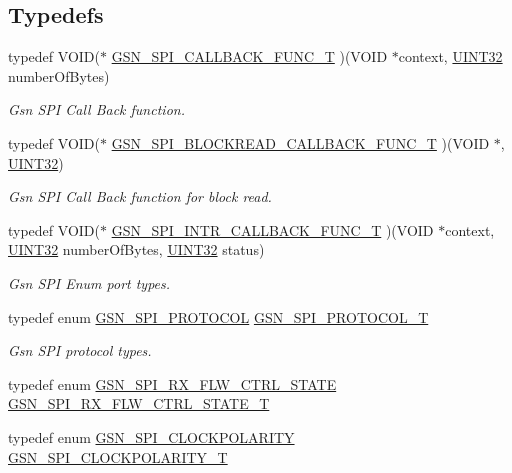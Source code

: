 \subsection*{Typedefs}
\begin{DoxyCompactItemize}
\item 
typedef VOID($\ast$ \hyperlink{a00655_gad27c6db61273e0b521637db94b638cdb}{GSN\_\-SPI\_\-CALLBACK\_\-FUNC\_\-T} )(VOID $\ast$context, \hyperlink{a00660_gae1e6edbbc26d6fbc71a90190d0266018}{UINT32} numberOfBytes)
\begin{DoxyCompactList}\small\item\em Gsn SPI Call Back function. \end{DoxyCompactList}\item 
typedef VOID($\ast$ \hyperlink{a00655_ga40c92f454b32d5fffa9780896cecdd02}{GSN\_\-SPI\_\-BLOCKREAD\_\-CALLBACK\_\-FUNC\_\-T} )(VOID $\ast$, \hyperlink{a00660_gae1e6edbbc26d6fbc71a90190d0266018}{UINT32})
\begin{DoxyCompactList}\small\item\em Gsn SPI Call Back function for block read. \end{DoxyCompactList}\item 
typedef VOID($\ast$ \hyperlink{a00655_ga4319e7be0e14776c7cd2c7ff7ca8f2c2}{GSN\_\-SPI\_\-INTR\_\-CALLBACK\_\-FUNC\_\-T} )(VOID $\ast$context, \hyperlink{a00660_gae1e6edbbc26d6fbc71a90190d0266018}{UINT32} numberOfBytes, \hyperlink{a00660_gae1e6edbbc26d6fbc71a90190d0266018}{UINT32} status)
\begin{DoxyCompactList}\small\item\em Gsn SPI Enum port types. \end{DoxyCompactList}\item 
typedef enum \hyperlink{a00655_gaaabdab9df4e565fb0f07162bb2f22dc4}{GSN\_\-SPI\_\-PROTOCOL} \hyperlink{a00655_gafc404344d5f8c6a8358fa3be07a87444}{GSN\_\-SPI\_\-PROTOCOL\_\-T}
\begin{DoxyCompactList}\small\item\em Gsn SPI protocol types. \end{DoxyCompactList}\item 
typedef enum \hyperlink{a00587_ad34f711f03e3ba0055566119931ebfa6}{GSN\_\-SPI\_\-RX\_\-FLW\_\-CTRL\_\-STATE} \hyperlink{a00587_a833a62a5682b1e7d499bd6334b2701f5}{GSN\_\-SPI\_\-RX\_\-FLW\_\-CTRL\_\-STATE\_\-T}
\item 
typedef enum \hyperlink{a00655_ga6d27ddbf02c08f4f80f88328bb907f94}{GSN\_\-SPI\_\-CLOCKPOLARITY} \hyperlink{a00655_ga40c914db809ec79fd3a564dda8364aea}{GSN\_\-SPI\_\-CLOCKPOLARITY\_\-T}

\end{DoxyCompactItemize}
